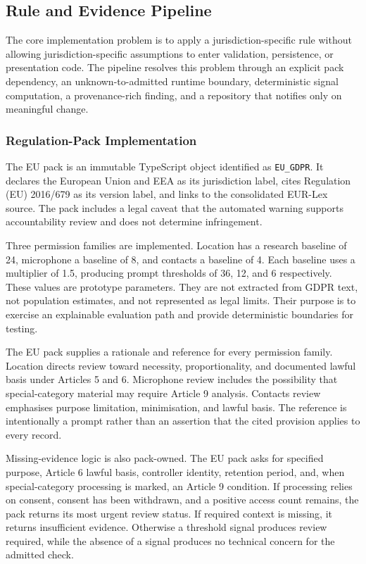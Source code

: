\subsection{Rule and Evidence Pipeline}

The core implementation problem is to apply a jurisdiction-specific rule without allowing jurisdiction-specific assumptions to enter validation, persistence, or presentation code. The pipeline resolves this problem through an explicit pack dependency, an unknown-to-admitted runtime boundary, deterministic signal computation, a provenance-rich finding, and a repository that notifies only on meaningful change.

\subsubsection{Regulation-Pack Implementation}

The EU pack is an immutable TypeScript object identified as \texttt{EU\_GDPR}. It declares the European Union and EEA as its jurisdiction label, cites Regulation (EU) 2016/679 as its version label, and links to the consolidated EUR-Lex source. The pack includes a legal caveat that the automated warning supports accountability review and does not determine infringement.

Three permission families are implemented. Location has a research baseline of 24, microphone a baseline of 8, and contacts a baseline of 4. Each baseline uses a multiplier of 1.5, producing prompt thresholds of 36, 12, and 6 respectively. These values are prototype parameters. They are not extracted from GDPR text, not population estimates, and not represented as legal limits. Their purpose is to exercise an explainable evaluation path and provide deterministic boundaries for testing.

The EU pack supplies a rationale and reference for every permission family. Location directs review toward necessity, proportionality, and documented lawful basis under Articles 5 and 6. Microphone review includes the possibility that special-category material may require Article 9 analysis. Contacts review emphasises purpose limitation, minimisation, and lawful basis. The reference is intentionally a prompt rather than an assertion that the cited provision applies to every record.

Missing-evidence logic is also pack-owned. The EU pack asks for specified purpose, Article 6 lawful basis, controller identity, retention period, and, when special-category processing is marked, an Article 9 condition. If processing relies on consent, consent has been withdrawn, and a positive access count remains, the pack returns its most urgent review status. If required context is missing, it returns insufficient evidence. Otherwise a threshold signal produces review required, while the absence of a signal produces no technical concern for the admitted check.


